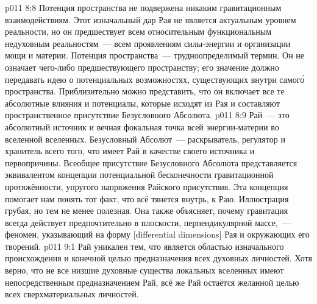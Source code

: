 \vs p011 8:8 \pc Потенция пространства не подвержена никаким гравитационным взаимодействиям. Этот изначальный дар Рая не является актуальным уровнем реальности, но он предшествует всем относительным функциональным недуховным реальностям~--- всем проявлениям силы\hyp{}энергии и организации мощи и материи. Потенция пространства~--- трудноопределимый термин. Он не означает чего\hyp{}либо предшествующего пространству; его значение должно передавать идею о потенциальных возможностях, существующих внутри самог\'о пространства. Приблизительно можно представить, что он включает все те абсолютные влияния и потенциалы, которые исходят из Рая и составляют пространственное присутствие Безусловного Абсолюта.
\vs p011 8:9 Рай~--- это абсолютный источник и вечная фокальная точка всей энергии\hyp{}материи во вселенной вселенных. Безусловный Абсолют~--- раскрыватель, регулятор и хранитель всего того, что имеет Рай в качестве своего источника и первопричины. Всеобщее присутствие Безусловного Абсолюта представляется эквивалентом концепции потенциальной бесконечности гравитационной протяжённости, упругого напряжения Райского присутствия. Эта концепция помогает нам понять тот факт, что всё тянется внутрь, к Раю. Иллюстрация грубая, но тем не менее полезная. Она также объясняет, почему гравитация всегда действует предпочтительно в плоскости, перпендикулярной массе,~--- феномен, указывающий на форму [differential dimensions] Рая и окружающих его творений.
\vs p011 9:1 Рай уникален тем, что является областью изначального происхождения и конечной целью предназначения всех духовных личностей. Хотя верно, что не все низшие духовные существа локальных вселенных имеют непосредственным предназначением Рай, всё же Рай остаётся желанной целью всех сверхматериальных личностей.
